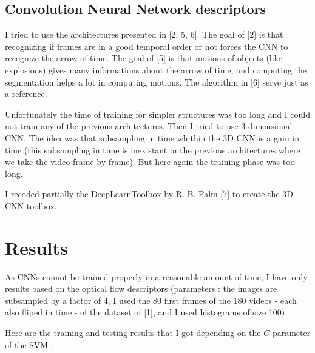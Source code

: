 \documentclass[10pt,a4paper]{report}
\begin{document}
		\subsection*{Convolution Neural Network descriptors}
		
		I tried to use the architectures presented in [2, 5, 6]. The goal of [2] is that recognizing if frames are in a good temporal order or not forces the CNN to recognize the arrow of time. The goal of [5] is that motions of objects (like explosions) gives many informations about the arrow of time, and computing the segmentation helps a lot in computing motions. The algorithm in [6] serve just as a reference.
		
		Unfortunately the time of training for simpler structures was too long and I could not train any of the previous architectures. Then I tried to use 3 dimensional CNN. The idea was that subsampling in time whithin the 3D CNN is a gain in time (this subsampling in time is inexistant in the previous architectures where we take the video frame by frame). But here again the training phase was too long.
		
		I recoded partially the DeepLearnToolbox by R. B. Palm [7] to create the 3D CNN toolbox.
		
		\section*{Results}
		
			As CNNs cannot be trained properly in a reasonable amount of time, I have only results based on the optical flow descriptors (parameters : the images are subsampled by a factor of 4, I used the 80 first frames of the 180 videos - each also fliped in time - of the dataset of [1], and I used histograms of size 100).
			
			Here are the training and testing results that I got depending on the $C$ parameter of the SVM :
		
\end{document}
